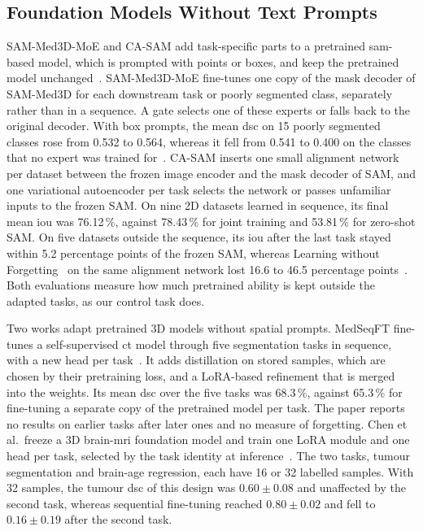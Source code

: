 \subsection{Foundation Models Without Text Prompts}
\label{subsec:cl-medseg-fm}

SAM-Med3D-MoE and CA-SAM add task-specific parts to a pretrained \gls{sam}-based model, which is prompted with points or boxes, and keep the pretrained model unchanged~\cite{wang2024sammed3dmoe,wang2025casam}.
SAM-Med3D-MoE fine-tunes one copy of the mask decoder of SAM-Med3D for each downstream task or poorly segmented class, separately rather than in a sequence.
A gate selects one of these experts or falls back to the original decoder.
With box prompts, the mean \gls{dsc} on 15 poorly segmented classes rose from 0.532 to 0.564, whereas it fell from 0.541 to 0.400 on the classes that no expert was trained for~\cite[Table~1]{wang2024sammed3dmoe}.
CA-SAM inserts one small alignment network per dataset between the frozen image encoder and the mask decoder of SAM, and one variational autoencoder per task selects the network or passes unfamiliar inputs to the frozen SAM.
On nine 2D datasets learned in sequence, its final mean \gls{iou} was 76.12\,\%, against 78.43\,\% for joint training and 53.81\,\% for zero-shot SAM.
On five datasets outside the sequence, its \gls{iou} after the last task stayed within 5.2 percentage points of the frozen SAM, whereas Learning without Forgetting~\cite{li2017learningforgetting} on the same alignment network lost 16.6 to 46.5 percentage points~\cite[Table~2]{wang2025casam}.
Both evaluations measure how much pretrained ability is kept outside the adapted tasks, as our control task does.

Two works adapt pretrained 3D models without spatial prompts.
MedSeqFT fine-tunes a self-supervised \gls{ct} model through five segmentation tasks in sequence, with a new head per task~\cite{ye2025medseqft}.
It adds distillation on stored samples, which are chosen by their pretraining loss, and a LoRA-based refinement that is merged into the weights.
Its mean \gls{dsc} over the five tasks was 68.3\,\%, against 65.3\,\% for fine-tuning a separate copy of the pretrained model per task.
The paper reports no results on earlier tasks after later ones and no measure of forgetting.
Chen et al.\ freeze a 3D brain-\gls{mri} foundation model and train one LoRA module and one head per task, selected by the task identity at inference~\cite{chen2026fewshotcontinuallearning3d}.
The two tasks, tumour segmentation and brain-age regression, each have 16 or 32 labelled samples.
With 32 samples, the tumour \gls{dsc} of this design was $0.60 \pm 0.08$ and unaffected by the second task, whereas sequential fine-tuning reached $0.80 \pm 0.02$ and fell to $0.16 \pm 0.19$ after the second task.

